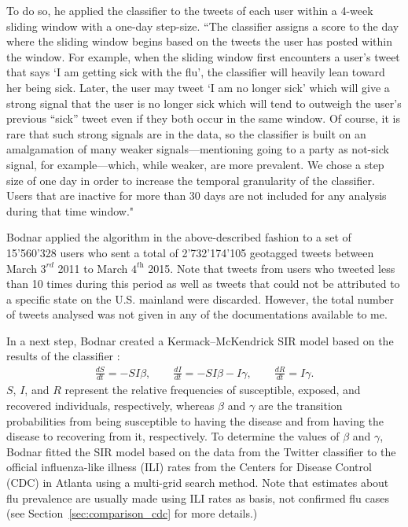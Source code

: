 \documentclass[11pt, a4paper,twoside]{report}\usepackage[]{graphicx}\usepackage[]{color}
\begin{document}
To do so, he applied the classifier to the tweets of each user within a 4-week sliding window with a one-day step-size. ``The classifier assigns a score to the day where the sliding window begins based on the tweets the user has posted within the window. For example, when the sliding window first encounters a user’s tweet that says `I am getting sick with the flu', the classifier will heavily lean toward her being sick. Later, the user may tweet `I am no longer sick' which will give a strong signal that the user is no longer sick which will tend to outweigh the user’s previous “sick” tweet even if they both occur in the same window. Of course, it is rare that such strong signals are in the data, so the classifier is built on an amalgamation of many weaker signals—mentioning going to a party as not-sick signal, for example---which, while weaker, are more prevalent. We chose a step size of one day in order to increase the temporal granularity of the classifier. Users that are inactive for more than 30 days are not included for any analysis during that time window."

Bodnar applied the algorithm in the above-described fashion to a set of 15'560'328 users who sent a total of 2'732'174'105 geotagged tweets between March $3^\textit{rd}$ 2011 to March $4^\textit{th}$ 2015. Note that tweets from users who tweeted less than 10 times during this period as well as tweets that could not be attributed to a specific state on the U.S. mainland were discarded. However, the total number of tweets analysed was not given in any of the documentations available to me. 

In a next step, Bodnar created a Kermack--McKendrick SIR model based on the results of the classifier \citep{martcheva2015introduction}:
\begin{align}
\frac{dS}{dt} = -SI\beta, \qquad \frac{dI}{dt} = -SI\beta - I\gamma, \qquad \frac{dR}{dt} = I\gamma. \label{eq:0}
\end{align}
$S$, $I$, and $R$ represent the relative frequencies of susceptible, exposed, and recovered individuals, respectively, whereas $\beta$ and $\gamma$ are the transition probabilities from being susceptible to having the disease and from having the disease to recovering from it, respectively. To determine the values of $\beta$ and $\gamma$, Bodnar fitted the SIR model based on the data from the Twitter classifier to the official influenza-like illness (ILI) rates from the Centers for Disease Control (CDC) in Atlanta using a multi-grid search method. Note that estimates about flu prevalence are usually made using ILI rates as basis, not confirmed flu cases (see Section~\ref{sec:comparison_cdc} for more details.)
\end{document}
